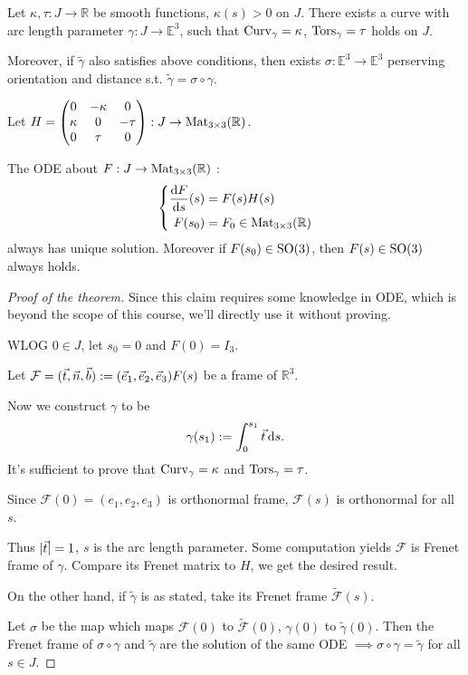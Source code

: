 \begin{theorem}
    Let $\kappa,\tau : J\to \mathbb{R}$ be smooth functions, $\kappa(s)>0$ on $J$.
	There exists a curve with arc length parameter $\gamma: J\to \mathbb{E}^3$,
	such that $\operatorname{Curv}_\gamma = \kappa$, $\operatorname{Tors}_\gamma = \tau$ holds
	on $J$.

	Moreover, if $\tilde \gamma$ also satisfies above conditions,
	then exists $\sigma: \mathbb{E}^3\to \mathbb{E}^3$ perserving orientation and
	distance s.t.  $\tilde\gamma = \sigma\circ\gamma$.
\end{theorem}
\begin{claim}
	Let $H = \begin{pmatrix}
		0&-\kappa&0\\\kappa&0&-\tau\\0&\tau&0
	\end{pmatrix}
	: J\to \mathrm{Mat}_{3 \times 3}(\mathbb{R})$.

	The ODE about $F: J\to \mathrm{Mat}_{3 \times 3}(\mathbb{R})$ :
	\[
	\left\{\begin{aligned}
			\frac{\mathop{}\!\mathrm{d} F}{\mathop{}\!\mathrm{d} s}(s) &= F(s)H(s)\\
			F(s_0) &= F_0\in \mathrm{Mat}_{3 \times 3}(\mathbb{R})
	\end{aligned}
	\right.
	\]
	always has unique solution.
	Moreover if $F(s_0)\in \mathrm{SO}(3)$, then $F(s)\in \mathrm{SO}(3)$ always holds.
\end{claim}
\begin{proof}[Proof of the theorem]
	Since this claim requires some knowledge in ODE, which is beyond the scope of
	this course, we'll directly use it without proving.

	WLOG $0\in J$, let  $s_0=0$ and $F(0)=I_3$.

	Let $\mathcal{F} = (\vec{t},\vec{n},\vec{b}) := (\vec{e}_1,\vec{e}_2,\vec{e}_3)F(s)$
	be a frame of $\mathbb{R}^3$.

	Now we construct $\gamma$ to be
	\[
	\gamma(s_1) := \int_{0}^{s_1} \vec{t}\mathop{}\!\mathrm{d} s.
	\]
	It's sufficient to prove that $\operatorname{Curv}_\gamma=\kappa$ and  $\operatorname{Tors}_\gamma=\tau$.

	Since $\mathcal{F}(0)=(e_1,e_2,e_3)$ is orthonormal frame,
	$\mathcal{F}(s)$ is orthonormal for all $s$.

	Thus  $|\vec{t}| = 1$, $s$ is the arc length parameter.
	Some computation yields $\mathcal{F}$ is Frenet frame of $\gamma$.
	Compare its Frenet matrix to $H$, we get the desired result.

	On the other hand, if  $\tilde\gamma$ is as stated,
	take its Frenet frame $\tilde {\mathcal{F}}(s)$.

	Let $\sigma$ be the map which maps $\mathcal{F}(0)$ to $\tilde {\mathcal{F}}(0)$,
	$\gamma(0)$ to $\tilde\gamma(0)$.
	Then the Frenet frame of $\sigma\circ\gamma$ and  $\tilde\gamma$
	are the solution of the same ODE
	$\implies \sigma\circ\gamma=\tilde\gamma$ for all $s\in J$.
\end{proof}
